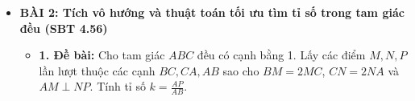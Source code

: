 \documentclass[12pt,a4paper]{article}
\begin{document}
\begin{itemize}
\begin{itemize}
\begin{itemize}
            \item \textbf{Ý 3: Tính độ dài các đoạn thẳng $AI$ và $BI$}\\
            Áp dụng tính chất vuông góc $\vec{AB} \cdot \vec{AD} = 0$, ta tính bình phương độ dài đoạn thẳng $AI$:
            \begin{align*}
                AI^2 = \vec{AI}^2 &= \left(\frac{9}{14}\vec{AB} + \frac{4}{7}\vec{AD}\right)^2 \\
                &= \frac{81}{196}AB^2 + \frac{16}{49}AD^2 + 2 \cdot \frac{9}{14} \cdot \frac{4}{7}(\vec{AB} \cdot \vec{AD}) \\
                &= \frac{81}{196}(2^2) + \frac{16}{49}(3^2) + 0 = \frac{81}{49} + \frac{144}{49} = \frac{225}{49} \\
                \Longrightarrow AI &= \sqrt{\frac{225}{49}} = \frac{15}{7}
            \end{align*}
            Với đoạn $BI$, ta phân tích hiệu vectơ $\vec{BI} = \vec{AI} - \vec{AB}$:
            \begin{align*}
                \vec{BI} &= \left(\frac{9}{14}\vec{AB} + \frac{4}{7}\vec{AD}\right) - \vec{AB} = -\frac{5}{14}\vec{AB} + \frac{4}{7}\vec{AD} \\
                BI^2 = \vec{BI}^2 &= \frac{25}{196}AB^2 + \frac{16}{49}AD^2 + 0 \\
                &= \frac{25}{196}(4) + \frac{16}{49}(9) = \frac{25}{49} + \frac{144}{49} = \frac{169}{49} \\
                \Longrightarrow BI &= \sqrt{\frac{169}{49}} = \frac{13}{7}
            \end{align*}
        \end{itemize}
        \textbf{Kết luận:} $\vec{CM} = -\frac{1}{2}\vec{AB} - \frac{1}{3}\vec{AD}$, $\vec{CD} = -\vec{AB} + \frac{2}{3}\vec{AD}$; $\vec{AI} = \frac{9}{7}\vec{AG}$; $AI = \frac{15}{7}$; $BI = \frac{13}{7}$.
    \end{itemize}

    \vspace{4mm}

    \item \textbf{BÀI 2: Tích vô hướng và thuật toán tối ưu tìm tỉ số trong tam giác đều (SBT 4.56)}
    \begin{itemize}
        \item \textbf{1. Đề bài:}
        Cho tam giác $ABC$ đều có cạnh bằng 1. Lấy các điểm $M, N, P$ lần lượt thuộc các cạnh $BC, CA, AB$ sao cho $BM = 2MC$, $CN = 2NA$ và $AM \perp NP$. Tính tỉ số $k = \frac{AP}{AB}$.


\end{itemize}
\end{itemize}
\end{document}
